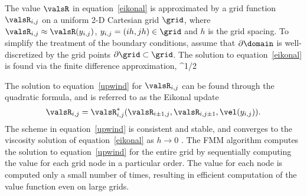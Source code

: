 The value $\valsR$ in equation~\eqref{eikonal} is approximated by a grid function $\valsR_{i,j}$ on a uniform 2-D Cartesian grid $\grid$, where $\valsR_{i,j} \approx \valsR(y_{i,j})$, $y_{i,j}=(ih,jh)\in\grid$ and $h$ is the grid spacing.
To simplify the treatment of the boundary conditions, assume that $\partial\domain$ is well-discretized by the grid points $\partial\grid\subset\grid$.
The solution to equation~\eqref{eikonal} is found via the finite difference approximation,
\bq\label{upwind}
 ^{1/2}\!\!
\eq



The solution to equation~\eqref{upwind} for $\valsR_{i,j}$ can be found through the quadratic formula, and is referred to as the Eikonal update
\begin{equation}\label{EikonalUpdate}
 \valsR_{i,j} = \valsR_{i,j}^*(\valsR_{i\pm1,j},\valsR_{i,j\pm1},\vel(y_{i,j})). 
\end{equation}
The scheme in equation~\eqref{upwind} is consistent and stable, and converges to the viscosity solution of equation~\eqref{eikonal} as $h\rightarrow 0$ \cite{RouyTourin}.
The FMM algorithm computes the solution to equation~\eqref{upwind} for the entire grid by sequentially computing the value for each grid node in a particular order. 
The value for each node is computed only a small number of times, resulting in efficient computation of the value function even on large grids. 

